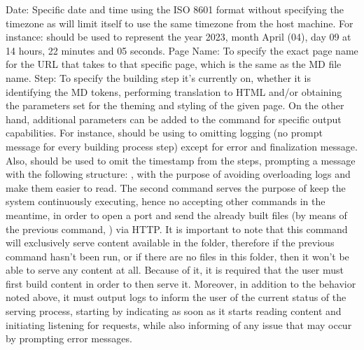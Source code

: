 {}\markdownRendererUlBeginTight
\markdownRendererUlItem Date: Specific date and time using the ISO 8601 format  without specifying the timezone as  will limit itself to use the same timezone from the host machine. For instance:  should be used to represent the year 2023, month April (04), day 09 at 14 hours, 22 minutes and 05 seconds.\markdownRendererUlItemEnd 
\markdownRendererUlItem Page Name: To specify the exact page name for the URL that takes to that specific page, which is the same as the MD file name.\markdownRendererUlItemEnd 
\markdownRendererUlItem Step: To specify the building step it's currently on, whether it is identifying the MD tokens, performing translation to HTML and/or obtaining the parameters set for the theming and styling of the given page.\markdownRendererUlItemEnd 
\markdownRendererUlEndTight \markdownRendererInterblockSeparator
{}On the other hand, additional parameters can be added to the command for specific output capabilities. For instance,  should be using to omitting logging (no prompt message for every building process step) except for error and finalization message. Also,  should be used to omit the timestamp from the steps, prompting a message with the following structure: , with the purpose of avoiding overloading logs and make them easier to read.\markdownRendererInterblockSeparator
{}\markdownRendererInterblockSeparator
{}The second command serves the purpose of keep the system continuously executing, hence no accepting other commands in the meantime, in order to open a port and send the already built files (by means of the previous command, ) via HTTP.\markdownRendererInterblockSeparator
{}It is important to note that this command will exclusively serve content available in the  folder, therefore if the previous command hasn't been run, or if there are no files in this folder, then it won't be able to serve any content at all. Because of it, it is required that the user must first build content in order to then serve it.\markdownRendererInterblockSeparator
{}Moreover, in addition to the behavior noted above, it must output logs to inform the user of the current status of the serving process, starting by indicating as soon as it starts reading content and initiating listening for requests, while also informing of any issue that may occur by prompting error messages.\markdownRendererInterblockSeparator

